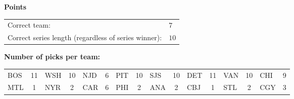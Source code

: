 \documentclass[10pt]{article}
\begin{document}
{\bf Points}\\
\begin{minipage}{12cm}
    \begin{tabular}{l l}
        Correct team:	& $7$\\
        Correct series length (regardless of series winner):	& $10$\\    \end{tabular}

    \vspace{1cm}
    {\bf Number of picks per team:}\\
    \begin{tabular}{lc | lc | lc | lc | lc | lc | lc | lc }
        BOS & 11 & WSH & 10 & NJD & 6 & PIT & 10 & SJS & 10 & DET & 11 & VAN & 10 & CHI & 9 \\
        MTL & 1 & NYR & 2 & CAR & 6 & PHI & 2 & ANA & 2 & CBJ & 1 & STL & 2 & CGY & 3 \\
    \end{tabular}
\end{minipage}
\end{document}
